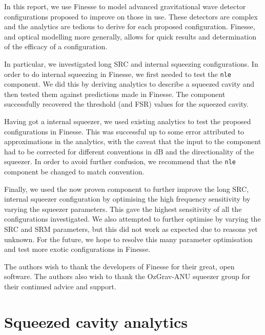 \documentclass[aps,pra,superscriptaddress,reprint,nofootinbib]{revtex4-1}
\newcommand{\code}[1]{\texttt{#1}}
\begin{document}
In this report, we use Finesse to model advanced gravitational wave detector configurations proposed to improve on those in use. These detectors are complex and the analytics are tedious to derive for each proposed configuration. Finesse, and optical modelling more generally, allows for quick results and determination of the efficacy of a configuration.


In particular, we investigated long SRC and internal squeezing configurations. In order to do internal squeezing in Finesse, we first needed to test the \code{nle} component. We did this by deriving analytics to describe a squeezed cavity and then tested them against predictions made in Finesse. The component successfully recovered the threshold (and FSR) values for the squeezed cavity.


Having got a internal squeezer, we used existing analytics to test the proposed configurations in Finesse. This was successful up to some error attributed to approximations in the analytics, with the caveat that the input to the component had to be corrected for different conventions in dB and the directionality of the squeezer. In order to avoid further confusion, we recommend that the \code{nle} component be changed to match convention.


Finally, we used the now proven component to further improve the long SRC, internal squeezer configuration by optimising the high frequency sensitivity by varying the squeezer parameters. This gave the highest sensitivity of all the configurations investigated. We also attempted to further optimise by varying the SRC and SRM parameters, but this did not work as expected due to reasons yet unknown. For the future, we hope to resolve this many parameter optimisation and test more exotic configurations in Finesse.


\begin{acknowledgments}
The authors wish to thank the developers of Finesse for their great, open software.
The authors also wish to thank the OzGrav-ANU squeezer group for their continued advice and support.

\end{acknowledgments}


\appendix
\section{Squeezed cavity analytics}
\label{app:squeezed_cavity_analytics}
\end{document}
